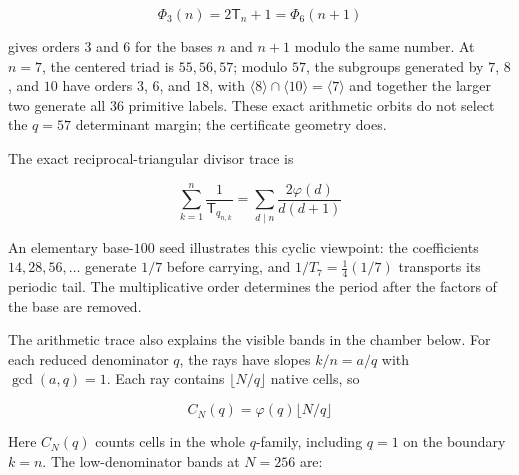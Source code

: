 \documentclass[
  11pt,
]{book}
\begin{document}
\[
\Phi_3(n)=2\mathsf T_n+1=\Phi_6(n+1)
\]

gives orders \(3\) and \(6\) for the bases \(n\) and \(n+1\) modulo the
same number. At \(n=7\), the centered triad is \(55,56,57\); modulo
\(57\), the subgroups generated by \(7\), \(8\), and \(10\) have orders
\(3\), \(6\), and \(18\), with
\(\langle8\rangle\cap\langle10\rangle=\langle7\rangle\) and together the
larger two generate all \(36\) primitive labels. These exact arithmetic
orbits do not select the \(q=57\) determinant margin; the certificate
geometry does.

The exact reciprocal-triangular divisor trace is

\[
\sum_{k=1}^{n}\frac1{\mathsf T_{q_{n,k}}}
=\sum_{d\mid n}\frac{2\varphi(d)}{d(d+1)}
\tag{98.4}
\]

An elementary base-\(100\) seed illustrates this cyclic viewpoint: the
coefficients \(14,28,56,\ldots\) generate \(1/7\) before carrying, and
\(1/T_7=\tfrac14(1/7)\) transports its periodic tail. The multiplicative
order determines the period after the factors of the base are removed.

The arithmetic trace also explains the visible bands in the chamber
below. For each reduced denominator \(q\), the rays have slopes
\(k/n=a/q\) with \(\gcd(a,q)=1\). Each ray contains
\(\lfloor N/q\rfloor\) native cells, so

\[
\boxed{C_N(q)=\varphi(q)\lfloor N/q\rfloor}
\tag{98.5}
\]

Here \(C_N(q)\) counts cells in the whole \(q\)-family, including
\(q=1\) on the boundary \(k=n\). The low-denominator bands at \(N=256\)
are:
\end{document}
